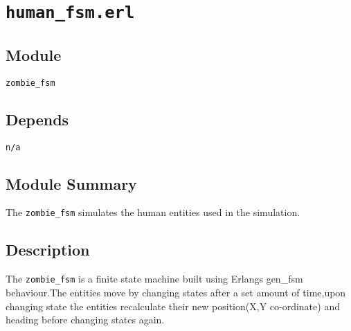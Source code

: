 \pagestyle{empty}
\section{\tt human\_fsm.erl}
\subsection{Module}
\verb+zombie_fsm+
\subsection{Depends}
{\tt n/a}
\subsection{Module Summary}
The \verb+zombie_fsm+ simulates the human entities used in the simulation.
\subsection{Description}
The \verb+zombie_fsm+ is a finite state machine built using Erlangs gen\_fsm behaviour.The entities move by changing states after a set amount of time,upon changing state the entities recalculate their new position(X,Y co-ordinate) and heading before changing states again. 
